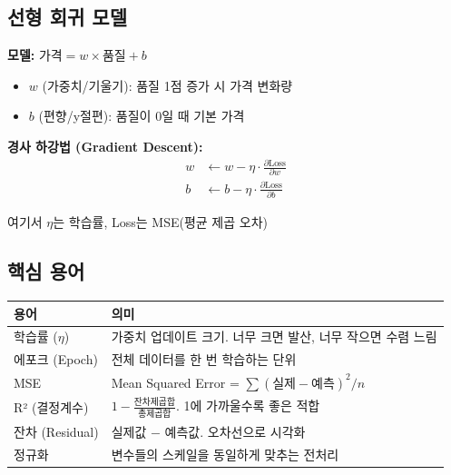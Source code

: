 \documentclass[11pt,a4paper]{article}
\begin{document}
\subsection{선형 회귀 모델}

\begin{tcolorbox}[colback=lightblue,colframe=darkblue,title=\textbf{\texttwemoji{chart increasing} 회귀식과 경사 하강법}]
\textbf{모델:} \quad $\text{가격} = w \times \text{품질} + b$

\begin{itemize}
    \item $w$ (가중치/기울기): 품질 1점 증가 시 가격 변화량
    \item $b$ (편향/y절편): 품질이 0일 때 기본 가격
\end{itemize}

\vspace{0.3cm}
\textbf{경사 하강법 (Gradient Descent):}
\begin{align}
w &\leftarrow w - \eta \cdot \frac{\partial \text{Loss}}{\partial w} \\
b &\leftarrow b - \eta \cdot \frac{\partial \text{Loss}}{\partial b}
\end{align}

여기서 $\eta$는 학습률, Loss는 MSE(평균 제곱 오차)
\end{tcolorbox}

\subsection{핵심 용어}

\begin{center}
\begin{tabular}{|p{3cm}|p{11cm}|}
\hline
\textbf{용어} & \textbf{의미} \\
\hline
학습률 ($\eta$) & 가중치 업데이트 크기. 너무 크면 발산, 너무 작으면 수렴 느림 \\
\hline
에포크 (Epoch) & 전체 데이터를 한 번 학습하는 단위 \\
\hline
MSE & Mean Squared Error = $\sum(\text{실제}-\text{예측})^2/n$ \\
\hline
R² (결정계수) & $1 - \frac{\text{잔차제곱합}}{\text{총제곱합}}$. 1에 가까울수록 좋은 적합 \\
\hline
잔차 (Residual) & 실제값 $-$ 예측값. 오차선으로 시각화 \\
\hline
정규화 & 변수들의 스케일을 동일하게 맞추는 전처리 \\
\hline
\end{tabular}
\end{center}
\end{document}
